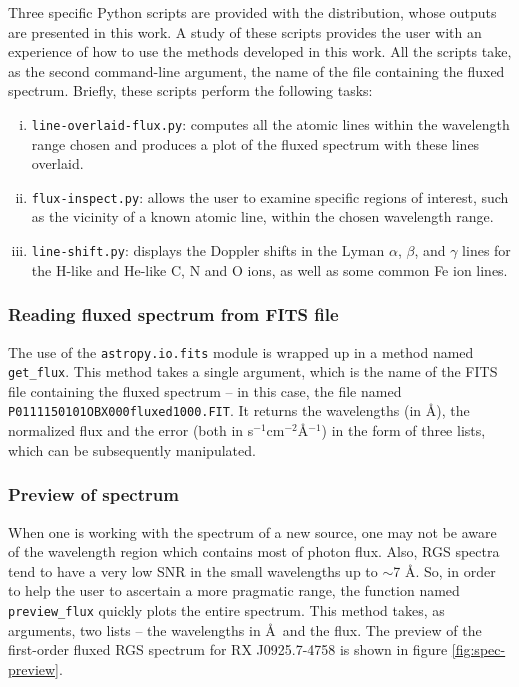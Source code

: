             Three specific Python scripts are provided with the distribution, whose outputs are presented in this work. A study of these scripts provides the user with an experience of how to use the methods developed in this work. All the scripts take, as the second command-line argument, the name of the file containing the fluxed spectrum. Briefly, these scripts perform the following tasks:
            
            \begin{enumerate}[i.]
                \item \texttt{line-overlaid-flux.py}: computes all the atomic lines within the wavelength range chosen and produces a plot of the fluxed spectrum with these lines overlaid.
                
                \item \texttt{flux-inspect.py}: allows the user to examine specific regions of interest, such as the vicinity of a known atomic line, within the chosen wavelength range.
                
                \item \texttt{line-shift.py}: displays the Doppler shifts in the Lyman $\alpha$, $\beta$, and $\gamma$ lines for the H-like and He-like C, N and O ions, as well as some common Fe ion lines.
            \end{enumerate}
        
            \subsubsection{Reading fluxed spectrum from FITS file} \label{tool:rgs-files:demonstration:read-flux}
                The use of the \texttt{astropy.io.fits} module is wrapped up in a method named \texttt{get\_flux}. This method takes a single argument, which is the name of the FITS file containing the fluxed spectrum -- in this case, the file named \texttt{P0111150101OBX000fluxed1000.FIT}. It returns the wavelengths (in \AA), the normalized flux and the error (both in s$^{-1}$cm$^{-2}$\AA$^{-1}$) in the form of three lists, which can be subsequently manipulated.
                
            \subsubsection{Preview of spectrum} \label{tool:rgs-files:demonstration:preview}
                When one is working with the spectrum of a new source, one may not be aware of the wavelength region which contains most of photon flux. Also, RGS spectra tend to have  a very low SNR in the small wavelengths up to $\sim$7 \AA. So, in order to help the user to ascertain a more pragmatic range, the function named \texttt{preview\_flux} quickly plots the entire spectrum. This method takes, as arguments, two lists -- the wavelengths in \AA~and the flux. The preview of the first-order fluxed RGS spectrum for RX J0925.7-4758 is shown in figure \ref{fig:spec-preview}.
                
